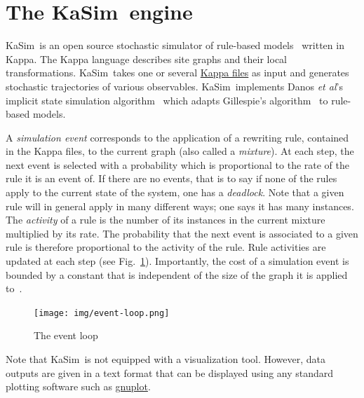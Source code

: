 \documentclass[11pt]{book}
\def\KaSim{\textsf{KaSim}}
\def\ie{ie }
\begin{document}
\section{The \KaSim~engine}
\KaSim~is an open source stochastic simulator of rule-based models~\cite{DanLan04,Dan_etal07a,Fae_etal05} written in Kappa. The Kappa language describes site graphs and their local transformations. \KaSim~takes one or several \hyperref[chap:kappa]{Kappa files} as input and generates stochastic trajectories of various observables. \KaSim~implements Danos \textit{et al}'s implicit state simulation algorithm~\cite{Dan_etal07b} which adapts Gillespie's algorithm~\cite{Gil76,Gil77} to rule-based models. 

A \emph{simulation event} corresponds to the application of a rewriting rule, contained in the Kappa files, to the current graph (also called a \emph{mixture}). 
At each step, the next event %
is selected with a probability which is proportional to the rate of the rule it is an event of.
If there are no events, that is to say if none of the rules apply to the current state of the system, one has a \emph{deadlock}. Note that a given rule will in general apply in many different ways; one says it has many instances. The \emph{activity} of a rule is the number of its instances in the current mixture multiplied by its rate. The probability that the next event is associated to a given rule is therefore proportional to the activity of the rule.
Rule activities are updated at
each step (see Fig.~\ref{fig:event-loop}). Importantly, the cost of a simulation event is bounded by a constant that is independent of the size of the graph it is applied to~\cite{Dan_etal07b}. 

\begin{figure}[htbp]
\begin{center}
\texttt{[image: img/event-loop.png]}
\caption{The event loop}
\label{fig:event-loop}
\end{center}
\end{figure}

Note that \KaSim~is not equipped with a %
visualization tool. However, data outputs are given in a text format that can be displayed using any standard plotting software such as \href{http://www.gnuplot.info/}{gnuplot}.
\end{document}
